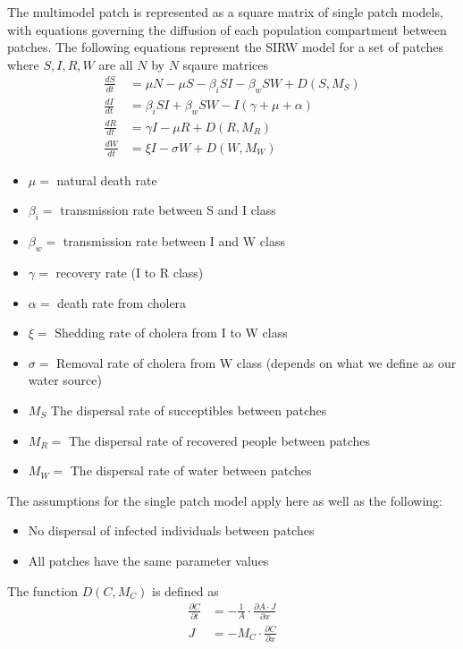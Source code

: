 \documentclass[12pt]{article}\usepackage[]{graphicx}\usepackage[]{color}
\begin{document}
The multimodel patch is represented as a square matrix of single patch models, with equations governing the diffusion of each population compartment between patches.
The following equations represent the SIRW model for a set of patches where $S,I,R,W$ are all $N$ by $N$ sqaure matrices
\begin{align*}
    \frac{dS}{dt}&= \mu N - \mu S - \beta_i S I - \beta_w S W + D(S,M_S)\\
    \frac{dI}{dt}&= \beta_i S I + \beta_w S W - I(\gamma + \mu + \alpha)\\
    \frac{dR}{dt}&= \gamma I - \mu R  + D(R,M_R) \\
    \frac{dW}{dt}&= \xi I - \sigma W + D(W,M_W)
\end{align*}
\begin{itemize}
    \item$\mu=$ natural death rate
    \item$\beta_i=$ transmission rate between S and I class
    \item$\beta_w=$ transmission rate between I and W class
    \item$\gamma=$ recovery rate (I to R class)
    \item$\alpha=$ death rate from cholera
    \item$\xi=$ Shedding rate of cholera from I to W class
    \item$\sigma=$	Removal rate of cholera from W class (depends on what we define as our water source)
    \item$M_S$ The dispersal rate of succeptibles between patches
    \item$M_R=$ The dispersal rate of recovered people between patches
    \item$M_W=$ The dispersal rate of water between patches
\end{itemize}
The assumptions for the single patch model apply here as well as the following:
\begin{itemize}
    \item No dispersal of infected individuals between patches
    \item All patches have the same parameter values
\end{itemize}
The function $D(C,M_C)$ is defined as
\begin{align*}
    \frac{\partial C}{\partial t} &= -\frac{1}{A} \cdot \frac{\partial A \cdot J}{\partial x}\\
    J &= - M_C \cdot \frac{\partial C}{\partial x}
\end{align*}
\end{document}
